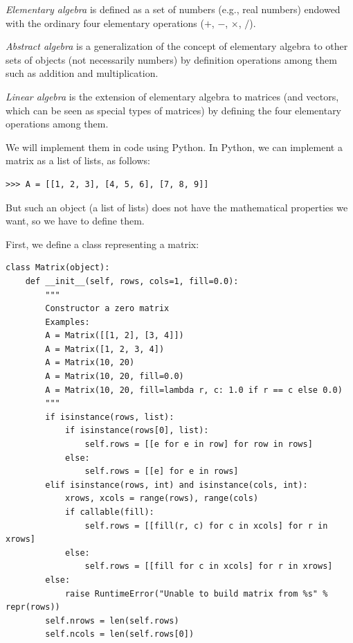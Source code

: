 \documentclass[justified, sixbynine]{tufte-book}
\def\ft{\small\tt}
\theoremstyle{plain}%
\newtheorem * {corollary}{Corollary}
\theoremstyle{definition}
\theoremstyle{remark}
\newtheorem * {remark}{Remark}
\newtheorem * {note}{Note}
\begin{document}
\begin{fullwidth}

{\it Elementary algebra} is defined as a set of numbers (e.g., real numbers) endowed with the ordinary four elementary operations ($+$, $-$, $\times$, $/$).

{\it Abstract algebra} is a generalization of the concept of elementary algebra to other sets of objects (not necessarily numbers) by definition operations among them such as addition and multiplication.

{\it Linear algebra} is the extension of elementary algebra to matrices (and vectors, which can be seen as special types of matrices) by defining the four elementary operations among them.

We will implement them in code using Python.
In Python, we can implement a matrix as a list of lists, as follows:
\begin{lstlisting}
>>> A = [[1, 2, 3], [4, 5, 6], [7, 8, 9]]
\end{lstlisting}
But such an object (a list of lists) does not have the mathematical properties we want, so we have to define them.

First, we define a class representing a matrix:



\begin{lstlisting}[caption={in file: {\ft nlib.py}}]
class Matrix(object):
    def __init__(self, rows, cols=1, fill=0.0):
        """
        Constructor a zero matrix
        Examples:
        A = Matrix([[1, 2], [3, 4]])
        A = Matrix([1, 2, 3, 4])
        A = Matrix(10, 20)
        A = Matrix(10, 20, fill=0.0)
        A = Matrix(10, 20, fill=lambda r, c: 1.0 if r == c else 0.0)
        """
        if isinstance(rows, list):
            if isinstance(rows[0], list):
                self.rows = [[e for e in row] for row in rows]
            else:
                self.rows = [[e] for e in rows]
        elif isinstance(rows, int) and isinstance(cols, int):
            xrows, xcols = range(rows), range(cols)
            if callable(fill):
                self.rows = [[fill(r, c) for c in xcols] for r in xrows]
            else:
                self.rows = [[fill for c in xcols] for r in xrows]
        else:
            raise RuntimeError("Unable to build matrix from %s" % repr(rows))
        self.nrows = len(self.rows)
        self.ncols = len(self.rows[0])
\end{lstlisting}


\end{fullwidth}
\end{document}

